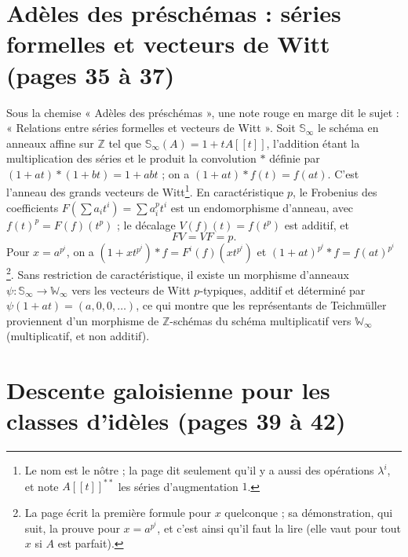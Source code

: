 \documentclass[11pt,a4paper]{article}
\begin{document}
\section*{Adèles des préschémas : séries formelles et vecteurs de Witt (pages 35 à 37)}

Sous la chemise « Adèles des préschémas », une note rouge en marge dit le sujet :
« Relations entre séries formelles et vecteurs de Witt ». Soit $\mathbb{S}_\infty$
le schéma en anneaux affine sur $\mathbb{Z}$ tel que $\mathbb{S}_\infty(A) =
1 + tA[[t]]$, l'addition étant la multiplication des séries et le produit la
convolution $*$ définie par $(1 + at) * (1 + bt) = 1 + abt$ ; on a $(1 + at) * f(t) =
f(at)$. C'est l'anneau des grands vecteurs de Witt\footnote{Le nom est le nôtre ;
la page dit seulement qu'il y a aussi des opérations $\lambda^{i}$, et note
$A[[t]]^{**}$ les séries d'augmentation $1$.}. En caractéristique $p$, le
Frobenius des coefficients $F(\sum a_i t^i) = \sum a_i^p t^i$ est un endomorphisme
d'anneau, avec $f(t)^p = F(f)(t^p)$ ; le décalage $V(f)(t) = f(t^p)$ est additif, et
\[
FV = VF = p.
\]
Pour $x = a^{p^i}$, on a $(1 + x t^{p^i}) * f = F^i(f)(x t^{p^i})$ et $(1 + at)^{p^i} *
f = f(at)^{p^i}$\footnote{La page écrit la première formule pour $x$ quelconque ;
sa démonstration, qui suit, la prouve pour $x = a^{p^i}$, et c'est ainsi qu'il faut
la lire (elle vaut pour tout $x$ si $A$ est parfait).}. Sans restriction de
caractéristique, il existe un morphisme d'anneaux $\psi : \mathbb{S}_\infty \to
\mathbb{W}_\infty$ vers les vecteurs de Witt $p$-typiques, additif et déterminé par
$\psi(1 + at) = (a, 0, 0, \ldots)$, ce qui montre que les représentants de
Teichmüller proviennent d'un morphisme de $\mathbb{Z}$-schémas du schéma
multiplicatif vers $\mathbb{W}_\infty$ (multiplicatif, et non additif).

\section*{Descente galoisienne pour les classes d'idèles (pages 39 à 42)}
\end{document}

